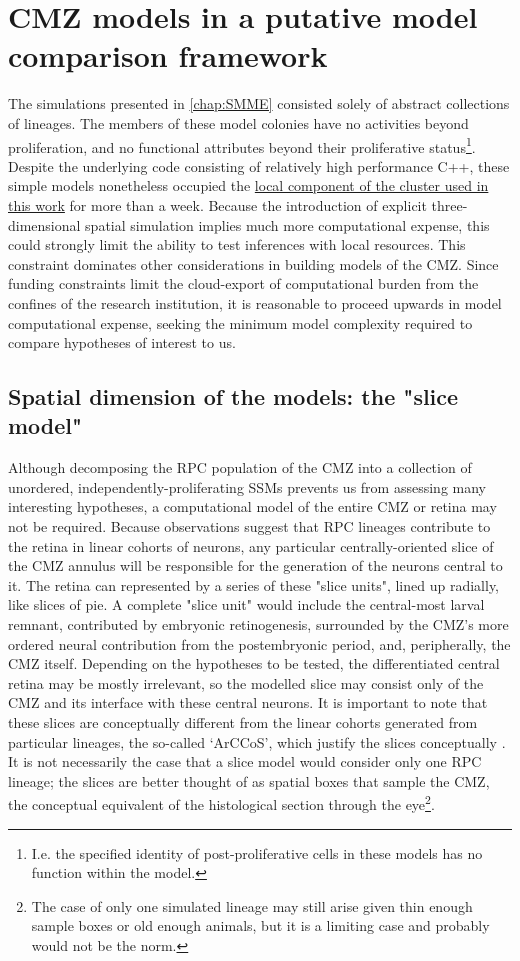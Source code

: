 \section{CMZ models in a putative model comparison framework}
The simulations presented in \autoref{chap:SMME} consisted solely of abstract collections of lineages. The members of these model colonies have no activities beyond proliferation, and no functional attributes beyond their proliferative status\footnote{I.e. the specified identity of post-proliferative cells in these models has no function within the model.}. Despite the underlying code consisting of relatively high performance C++, these simple models nonetheless occupied the \hyperref[sec:cluster]{local component of the cluster used in this work} for more than a week. Because the introduction of explicit three-dimensional spatial simulation implies much more computational expense, this could strongly limit the ability to test inferences with local resources. This constraint dominates other considerations in building models of the CMZ. Since funding constraints limit the cloud-export of computational burden from the confines of the research institution, it is reasonable to proceed upwards in model computational expense, seeking the minimum model complexity required to compare hypotheses of interest to us.

\subsection{Spatial dimension of the models: the "slice model"}
\label{ssec:slice}
Although decomposing the RPC population of the CMZ into a collection of unordered, independently-proliferating SSMs prevents us from assessing many interesting hypotheses, a computational model of the entire CMZ or retina may not be required. Because observations suggest that RPC lineages contribute to the retina in linear cohorts of neurons, any particular centrally-oriented slice of the CMZ annulus will be responsible for the generation of the neurons central to it. The retina can represented by a series of these "slice units", lined up radially, like slices of pie. A complete "slice unit" would include the central-most larval remnant, contributed by embryonic retinogenesis, surrounded by the CMZ's more ordered neural contribution from the postembryonic period, and, peripherally, the CMZ itself. Depending on the hypotheses to be tested, the differentiated central retina may be mostly irrelevant, so the modelled slice may consist only of the CMZ and its interface with these central neurons. It is important to note that these slices are conceptually different from the linear cohorts generated from particular lineages, the so-called `ArCCoS', which justify the slices conceptually \cite{Centanin2011}. It is not necessarily the case that a slice model would consider only one RPC lineage; the slices are better thought of as spatial boxes that sample the CMZ, the conceptual equivalent of the histological section through the eye\footnote{The case of only one simulated lineage may still arise given thin enough sample boxes or old enough animals, but it is a limiting case and probably would not be the norm.}.

